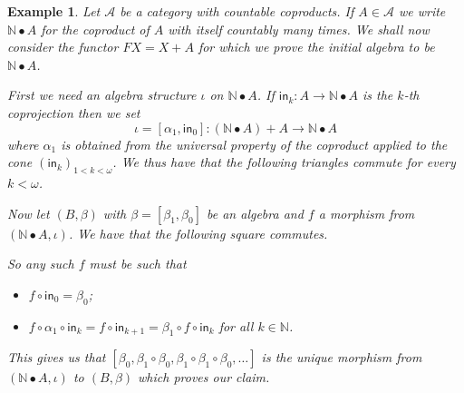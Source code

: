 \documentclass[letterpaper, 11pt, oneside]{memoir}
\theoremstyle{myteo}
\newtheorem{example}[theorem]{Example}
\numberwithin{equation}{section}
\newcommand{\id}{\textsf{id}}
\begin{document}
\begin{example}
  Let \(\mathscr{A}\) be a category with countable coproducts.
  If \(A \in \mathscr{A}\) we write \(\mathbb{N} \bullet A\) for the coproduct of \(A\) with itself countably many times.
  We shall now consider the functor \(FX = X + A\) for which we prove the initial algebra to be \(\mathbb{N} \bullet A\).

  First we need an algebra structure \(\iota\) on \(\mathbb{N} \bullet A\).
  If \(\textsf{in}_k \colon A \to \mathbb{N} \bullet A\) is the \(k\)-th coprojection then we set
  \begin{equation}
    \iota = [\alpha_1, \textsf{in}_0] \colon (\mathbb{N} \bullet A) + A \to \mathbb{N} \bullet A
  \end{equation}
  where \(\alpha_1\) is obtained from the universal property of the coproduct applied to the cone \((\textsf{in}_k)_{1 < k < \omega}\).
  We thus have that the following triangles commute for every \(k < \omega\).
  \begin{center}
  \end{center}
  Now let \((B, \beta)\) with \(\beta = [\beta_1, \beta_0]\) be an algebra and \(f\) a morphism from \((\mathbb{N} \bullet A, \iota)\).
  We have that the following square commutes.
  \begin{center}
  \end{center}
  So any such \(f\) must be such that
  \begin{itemize}
  \item[1.] \(f \circ \textsf{in}_0 = \beta_0\);
  \item[2.] \(f \circ \alpha_1 \circ \textsf{in}_k = f \circ \textsf{in}_{k+1} = \beta_1 \circ f \circ \textsf{in}_k\) for all \(k \in \mathbb{N}\).
  \end{itemize}
  This gives us that \([\beta_0, \beta_1\circ\beta_0, \beta_1\circ\beta_1\circ\beta_0, \ldots]\) is the unique morphism from \((\mathbb{N} \bullet A, \iota)\) to \((B, \beta)\) which proves our claim.
\end{example}
\end{document}
